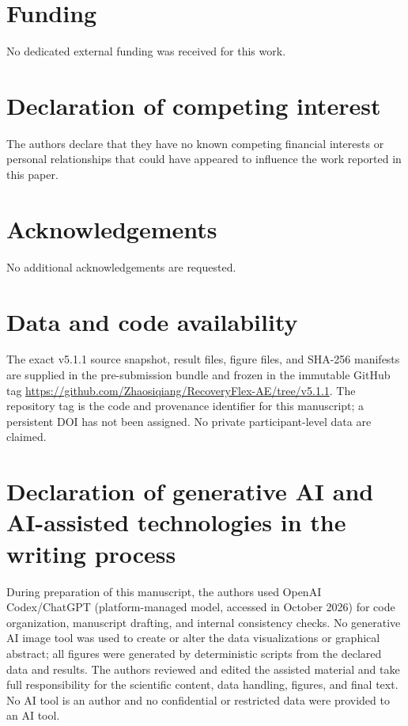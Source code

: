 \documentclass[11pt]{article}
\begin{document}
\section*{Funding}
No dedicated external funding was received for this work.

\section*{Declaration of competing interest}
The authors declare that they have no known competing financial interests or personal relationships that could have appeared to influence the work reported in this paper.

\section*{Acknowledgements}
No additional acknowledgements are requested.

\section*{Data and code availability}
The exact v5.1.1 source snapshot, result files, figure files, and SHA-256 manifests are supplied in the pre-submission bundle and frozen in the immutable GitHub tag \url{https://github.com/Zhaosiqiang/RecoveryFlex-AE/tree/v5.1.1}. The repository tag is the code and provenance identifier for this manuscript; a persistent DOI has not been assigned. No private participant-level data are claimed.

\section*{Declaration of generative AI and AI-assisted technologies in the writing process}
During preparation of this manuscript, the authors used OpenAI Codex/ChatGPT (platform-managed model, accessed in October 2026) for code organization, manuscript drafting, and internal consistency checks. No generative AI image tool was used to create or alter the data visualizations or graphical abstract; all figures were generated by deterministic scripts from the declared data and results. The authors reviewed and edited the assisted material and take full responsibility for the scientific content, data handling, figures, and final text. No AI tool is an author and no confidential or restricted data were provided to an AI tool.
\end{document}
